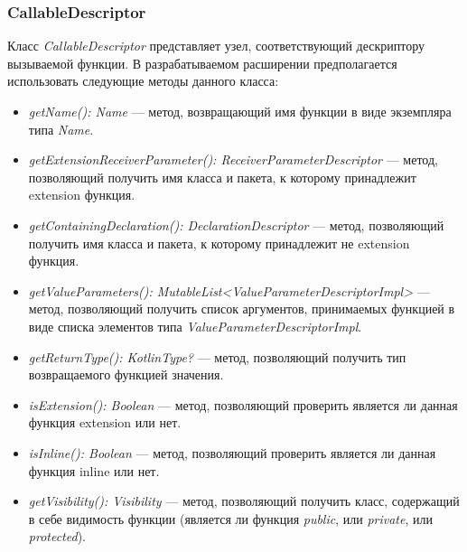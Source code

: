 \subsubsection{CallableDescriptor}
\label{ssub:callable_descriptor_description}
Класс \textit{CallableDescriptor} представляет узел, соответствующий
дескриптору вызываемой функции.
В разрабатываемом расширении предполагается использовать следующие методы
данного класса:
\begin{itemize}
	\item \textit{getName(): Name} --- метод, возвращающий имя функции в виде
		экземпляра типа \textit{Name}.
	\item \textit{getExtensionReceiverParameter(): ReceiverParameterDescriptor}
		--- метод, позволяющий получить имя класса и пакета, к которому принадлежит
		 extension функция.
	\item \textit{getContainingDeclaration(): DeclarationDescriptor} --- метод,
		позволяющий получить имя класса и пакета, к которому принадлежит не
		extension функция.
	\item \textit{getValueParameters(): MutableList<ValueParameterDescriptorImpl>}
		--- метод, позволяющий получить список аргументов, принимаемых функцией в
		виде списка элементов типа \textit{ValueParameterDescriptorImpl}.
	\item \textit{getReturnType(): KotlinType?} --- метод, позволяющий получить
		тип возвращаемого функцией значения.
	\item \textit{isExtension(): Boolean} --- метод, позволяющий проверить
		является ли данная функция extension или нет.
	\item \textit{isInline(): Boolean} --- метод, позволяющий проверить
		является ли данная функция inline или нет.
	\item \textit{getVisibility(): Visibility} --- метод, позволяющий получить
		класс, содержащий в себе видимость функции (является ли функция
		\textit{public}, или \textit{private}, или \textit{protected}).
\end{itemize}
